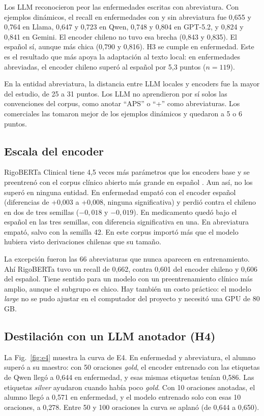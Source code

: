 \documentclass[10pt,journal,a4paper]{IEEEtran}
\begin{document}
Los LLM reconocieron peor las enfermedades escritas con abreviatura. Con ejemplos dinámicos, el recall en enfermedades con y sin abreviatura fue 0,655 y 0,764 en Llama, 0,647 y 0,723 en Qwen, 0,748 y 0,804 en GPT-5.2, y 0,824 y 0,841 en Gemini. El encoder chileno no tuvo esa brecha (0,843 y 0,835). El español sí, aunque más chica (0,790 y 0,816). H3 se cumple en enfermedad. Este es el resultado que más apoya la adaptación al texto local: en enfermedades abreviadas, el encoder chileno superó al español por 5,3 puntos ($n=119$).

En la entidad abreviatura, la distancia entre LLM locales y encoders fue la mayor del estudio, de 25 a 31 puntos. Los LLM no aprendieron por sí solos las convenciones del corpus, como anotar ``APS'' o ``+'' como abreviaturas. Los comerciales las tomaron mejor de los ejemplos dinámicos y quedaron a 5 o 6 puntos.

\subsection{Escala del encoder}

RigoBERTa Clinical tiene 4,5 veces más parámetros que los encoders base y se preentrenó con el corpus clínico abierto más grande en español \cite{subies2025}. Aun así, no los superó en ninguna entidad. En enfermedad empató con el encoder español (diferencias de +0,003 a +0,008, ninguna significativa) y perdió contra el chileno en dos de tres semillas ($-0,018$ y $-0,019$). En medicamento quedó bajo el español en las tres semillas, con diferencia significativa en una. En abreviatura empató, salvo con la semilla 42. En este corpus importó más que el modelo hubiera visto derivaciones chilenas que su tamaño.

La excepción fueron las 66 abreviaturas que nunca aparecen en entrenamiento. Ahí RigoBERTa tuvo un recall de 0,662, contra 0,601 del encoder chileno y 0,606 del español. Tiene sentido para un modelo con un preentrenamiento clínico más amplio, aunque el subgrupo es chico. Hay también un costo práctico: el modelo \emph{large} no se pudo ajustar en el computador del proyecto y necesitó una GPU de 80 GB.

\subsection{Destilación con un LLM anotador (H4)}\label{sec:e4}

La Fig.~\ref{fig:e4} muestra la curva de E4. En enfermedad y abreviatura, el alumno superó a su maestro: con 50 oraciones \emph{gold}, el encoder entrenado con las etiquetas de Qwen llegó a 0,644 en enfermedad, y esas mismas etiquetas tenían 0,586. Las etiquetas \emph{silver} ayudaron cuando había poco \emph{gold}. Con 10 oraciones anotadas, el alumno llegó a 0,571 en enfermedad, y el modelo entrenado solo con esas 10 oraciones, a 0,278. Entre 50 y 100 oraciones la curva se aplanó (de 0,644 a 0,650).
\end{document}
